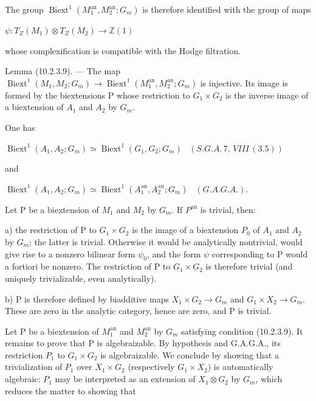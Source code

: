 \documentclass[11pt,twoside]{article}
\newcommand{\DFormula}[1]{%
  \par\smallskip\noindent\hspace*{0pt}\(\displaystyle #1\)\par\smallskip
}
\begin{document}
The group \(\operatorname{Biext}^{1}(M_{1}^{\mathrm{an}},M_{2}^{\mathrm{an}};G_{m})\) is therefore identified with the group of maps\par
\par\medskip
\DFormula{\psi :T_{Z}(M_{1})\otimes T_{Z}(M_{2})\to \mathbb{Z}(1)}
\par\medskip
whose complexification is compatible with the Hodge filtration.\par
\par\medskip
Lemma (10.2.3.9). — The map \(\operatorname{Biext}^{1}(M_{1},M_{2};G_{m})\to \operatorname{Biext}^{1}(M_{1}^{\mathrm{an}},M_{2}^{\mathrm{an}};G_{m})\) is injective. Its image is formed by the biextensions P whose restriction to \(G_{1}\times G_{2}\) is the inverse image of a biextension of \(A_{1}\) and \(A_{2}\) by \(G_{m}\).\par
\par\medskip
One has\par
\par\medskip
\DFormula{\operatorname{Biext}^{1}(A_{1},A_{2};G_{m})\simeq \operatorname{Biext}^{1}(G_{1},G_{2};G_{m})\,\,\,\,\,(S.G.A.\,7,\,VIII\,(3.5))}
\par\medskip
and\par
\par\medskip
\DFormula{\operatorname{Biext}^{1}(A_{1},A_{2};G_{m})\simeq \operatorname{Biext}^{1}(A_{1}^{\mathrm{an}},A_{2}^{\mathrm{an}};G_{m})\,\,\,\,\,(G.A.G.A.).}
\par\medskip
Let P be a biextension of \(M_{1}\) and \(M_{2}\) by \(G_{m}\). If \(P^{\mathrm{an}}\) is trivial, then:\par
\par\medskip
a) the restriction of P to \(G_{1}\times G_{2}\) is the image of a biextension \(P_{0}\) of \(A_{1}\) and \(A_{2}\) by \(G_{m}\); the latter is trivial. Otherwise it would be analytically nontrivial, would give rise to a nonzero bilinear form \(\psi _{0}\), and the form \(\psi \) corresponding to P would a fortiori be nonzero. The restriction of P to \(G_{1}\times G_{2}\) is therefore trivial (and uniquely trivializable, even analytically).\par
\par\medskip
b) P is therefore defined by biadditive maps \(X_{1}\times G_{2}\to G_{m}\) and \(G_{1}\times X_{2}\to G_{m}\). These are zero in the analytic category, hence are zero, and P is trivial.\par
\par\medskip
Let P be a biextension of \(M_{1}^{\mathrm{an}}\) and \(M_{2}^{\mathrm{an}}\) by \(G_{m}\) satisfying condition (10.2.3.9). It remains to prove that P is algebraizable. By hypothesis and G.A.G.A., its restriction \(P_{1}\) to \(G_{1}\times G_{2}\) is algebraizable. We conclude by showing that a trivialization of \(P_{1}\) over \(X_{1}\times G_{2}\) (respectively \(G_{1}\times X_{2})\) is automatically algebraic: \(P_{1}\) may be interpreted as an extension of \(X_{1}\otimes G_{2}\) by \(G_{m}\), which reduces the matter to showing that\par
\end{document}
